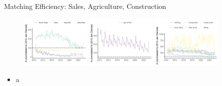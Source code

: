 \documentclass[aspectratio=169]{beamer}
\begin{document}
\begin{frame}{Matching Efficiency: Sales, Agriculture, Construction}
\begin{figure}[!ht]
  \begin{center}
  \includegraphics[width = 0.30\textwidth]
  {figuretable/matching_efficiency_month_aggregate_sales.png}
  \includegraphics[width = 0.30\textwidth]
  {figuretable/matching_efficiency_month_aggregate_agriculture_forestry_and_fishing.png}
  \includegraphics[width = 0.30\textwidth]
  {figuretable/matching_efficiency_month_aggregate_construction_and_mining.png}
  \end{center}
  \footnotesize
\end{figure} 
    \begin{itemize}
        \item a
    \end{itemize}
\end{frame}
\end{document}
